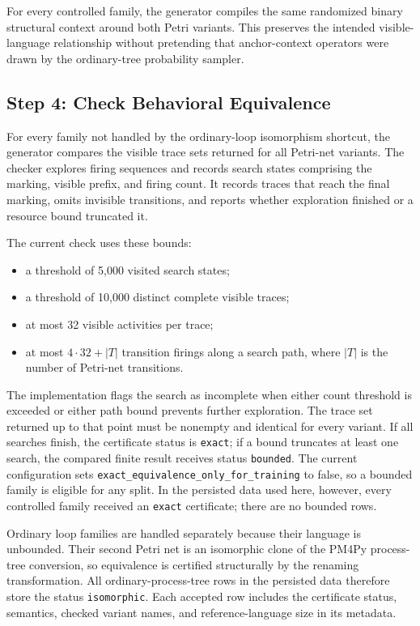 \documentclass[manuscript,screen,nonacm]{acmart}
\begin{document}
For every controlled family, the generator compiles the same randomized binary
structural context around both Petri variants. This preserves the intended
visible-language relationship without pretending that anchor-context operators
were drawn by the ordinary-tree probability sampler.

\subsection{Step 4: Check Behavioral Equivalence}
\label{app:equivalence-check}

For every family not handled by the ordinary-loop isomorphism shortcut, the
generator compares the visible trace sets returned for all Petri-net variants.
The checker explores firing sequences and records search states comprising the
marking, visible prefix, and firing count. It records traces that reach the
final marking, omits invisible transitions, and reports whether exploration
finished or a resource bound truncated it.

The current check uses these bounds:
\begin{itemize}
  \item a threshold of 5{,}000 visited search states;
  \item a threshold of 10{,}000 distinct complete visible traces;
  \item at most 32 visible activities per trace;
  \item at most $4\cdot32+|T|$ transition firings along a search path, where
        $|T|$ is the number of Petri-net transitions.
\end{itemize}
The implementation flags the search as incomplete when either count threshold
is exceeded or either path bound prevents further exploration. The trace set
returned up to that point must be nonempty and identical for every variant. If
all searches finish, the certificate status is \texttt{exact}; if a bound
truncates at least one search, the compared finite result receives status
\texttt{bounded}. The current configuration sets
\texttt{exact\_equivalence\_only\_for\_training} to false, so a bounded family
is eligible for any split. In the persisted data used here, however, every
controlled family received an \texttt{exact} certificate; there are no bounded
rows.

Ordinary loop families are handled separately because their language is
unbounded. Their second Petri net is an isomorphic clone of the PM4Py process-tree
conversion, so equivalence is certified structurally by the renaming
transformation. All ordinary-process-tree rows in the persisted data therefore store
the status \texttt{isomorphic}. Each accepted row includes the certificate
status, semantics, checked variant names, and reference-language size in its
metadata.
\end{document}

